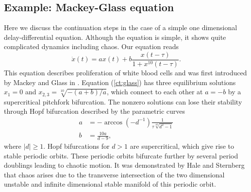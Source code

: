 \documentclass[10pt,a4paper]{ddedoc}
\begin{document}
\subsection{Example: Mackey-Glass equation}

Here we discuss the continuation steps in the case of a simple one dimensional
delay-differential equation. Although the equation is simple, it shows quite
complicated dynamics including chaos. Our equation reads
\begin{equation}
  \dot{x} ( t ) = ax ( t ) + b \frac{x ( t - \tau )}{1 + x^{10} ( t - \tau )}.
\label{ct:glass}
\end{equation}
This equation describes proliferation of white blood cells and was first
introduced by Mackey and Glass in {\cite{mackey}}. Equation (\ref{ct:glass})
has three equilibrium solutions $x_1 = 0$ and $x_{2, 3} = \sqrt[10]{- ( a + b
) / a}$, which connect to each other at $a = - b$ by a supercritical pitchfork
bifurcation. The nonzero solutions can lose their stability through Hopf
bifurcation described by the parametric curves
\begin{align*}
  a & =-\arccos(-d^{-1}){\frac{1}{{\tau} {\sqrt[10]{d^2-1}}}}\\
  b & ={\frac{10a}{d-9}},
\end{align*}
where $|d| \ge 1$. Hopf bifurcations for $d > 1$ are supercritical, which give
rise to stable periodic orbits. These periodic orbits bifurcate further by
several period doublings leading to chaotic motion. It was demonstrated by
Hale and Sternberg {\cite{sternberg}} that chaos arises due to the transverse
intersection of the two dimensional unstable and infinite dimensional stable
manifold of this periodic orbit.
\end{document}
